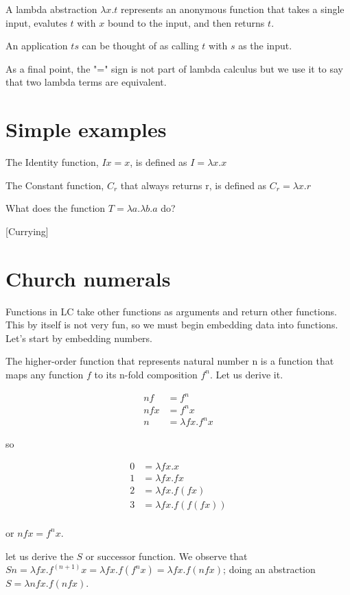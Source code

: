 \documentclass{article}
\begin{document}
A lambda abstraction $\lambda x.t$ represents an anonymous function that takes a single input, evalutes $t$ with $x$ bound to the input, and then returns $t$. 

An application $ts$ can be thought of as calling $t$ with $s$ as the input.

As a final point, the "=" sign is not part of lambda calculus but we use it to say that two lambda terms are equivalent.

\section{Simple examples}

The Identity function, $Ix = x$, is defined as $I = \lambda x.x$

The Constant function, $C_r$ that always returns r, is defined as $C_r = \lambda x.r$

What does the function $T = \lambda a.\lambda b.a$ do?

[Currying]

\section{Church numerals}

Functions in LC take other functions as arguments and return other functions. This by itself is not very fun, so we must begin embedding data into functions. Let's start by embedding numbers.

The higher-order function that represents natural number n is a function that maps any function $f$ to its n-fold composition $f^n$. Let us derive it.

\begin{align}
nf &= f^n \\
nfx &= f^nx \\
n &= \lambda fx.f^n x
\end{align}

so

\begin{align}
0 &= \lambda fx. x \\
1 &= \lambda fx. f x \\
2 &= \lambda fx. f (f x) \\
3 &= \lambda fx. f (f (f x)) \\
\end{align}

or $nfx = f^nx$.

let us derive the $S$ or successor function. We observe that $Sn = \lambda fx.f^{(n+1)}x = \lambda fx.f(f^nx) = \lambda fx.f(nfx)$; doing an abstraction $S = \lambda nfx.f(nfx)$.
\end{document}
